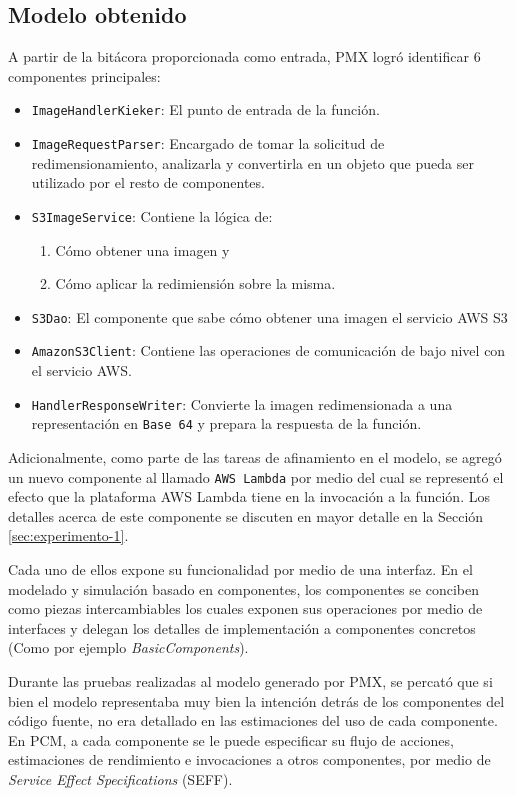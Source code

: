 \newpage
\subsection{Modelo obtenido}
A partir de la bitácora proporcionada como entrada, PMX logró identificar 6 componentes principales:
\begin{itemize} 
    \item \texttt{ImageHandlerKieker}: El punto de entrada de la función.
    \item \texttt{ImageRequestParser}: Encargado de tomar la solicitud de redimensionamiento, analizarla y convertirla en un objeto que pueda ser utilizado por el resto de componentes.
    \item \texttt{S3ImageService}: Contiene la lógica de:
        \begin{enumerate}
            \item Cómo obtener una imagen y
            \item Cómo aplicar la redimiensión sobre la misma.
        \end{enumerate}
    \item \texttt{S3Dao}: El componente que sabe cómo obtener una imagen el servicio AWS S3
    \item \texttt{AmazonS3Client}: Contiene las operaciones de comunicación de bajo nivel con el servicio AWS.
    \item \texttt{HandlerResponseWriter}: Convierte la imagen redimensionada a una representación en \texttt{Base 64} y prepara la respuesta de la función.
\end{itemize}

Adicionalmente, como parte de las tareas de afinamiento en el modelo, se agregó un nuevo componente al llamado \texttt{AWS Lambda} por medio del cual se representó el efecto que la plataforma AWS Lambda tiene en la invocación a la función. Los detalles acerca de este componente se discuten en mayor detalle en la Sección \ref{sec:experimento-1}. 

Cada uno de ellos expone su funcionalidad por medio de una interfaz. En el modelado y simulación basado en componentes, los componentes se conciben como piezas intercambiables los cuales exponen sus operaciones por medio de interfaces y delegan los detalles de implementación a componentes concretos (Como por ejemplo \emph{BasicComponents}). 

Durante las pruebas realizadas al modelo generado por PMX, se percató que si bien el modelo representaba muy bien la intención detrás de los componentes del código fuente, no era detallado en las estimaciones del uso de cada componente. En PCM, a cada componente se le puede especificar su flujo de acciones, estimaciones de rendimiento e invocaciones a otros componentes, por medio de \emph{Service Effect Specifications} (SEFF). 

